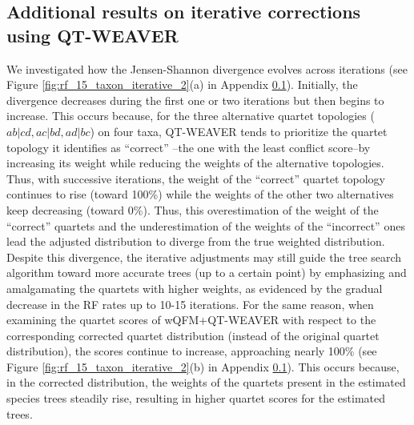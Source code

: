\documentclass[10pt,a4paper]{article}
\begin{document}
\begin{appendices}

\clearpage

\subsection{Additional results on iterative corrections using QT-WEAVER}
\label{app:iterations}

We investigated how the Jensen-Shannon divergence evolves across iterations (see Figure \ref{fig:rf_15_taxon_iterative_2}(a) in Appendix \ref{app:iterations}). Initially, the divergence decreases during the first one or two iterations but then begins to increase. This occurs because, for the three alternative quartet topologies ($ab|cd, ac|bd, ad|bc$) on four taxa, QT-WEAVER tends to prioritize the quartet topology it identifies as ``correct'' --the one with the least conflict score--by increasing its weight while reducing the weights of the alternative topologies.  Thus, with successive iterations, the weight of the ``correct'' quartet topology continues to rise (toward 100\%) while the weights of the other two alternatives keep decreasing (toward 0\%). Thus, this overestimation of the weight of the ``correct'' quartets and the underestimation of the weights of the ``incorrect'' ones lead the adjusted distribution to diverge from the true weighted distribution. Despite this divergence, the iterative adjustments may still guide the tree search algorithm toward more accurate trees (up to a certain point) by emphasizing and amalgamating the quartets with higher weights, as evidenced by the gradual decrease in the RF rates up to 10-15 iterations. For the same reason, when examining the quartet scores of wQFM+QT-WEAVER with respect to the corresponding corrected quartet distribution (instead of the original quartet distribution), the scores continue to increase, approaching nearly 100\% (see Figure \ref{fig:rf_15_taxon_iterative_2}(b) in Appendix \ref{app:iterations}). This occurs because, in the corrected distribution, the weights of the quartets present in the estimated species trees steadily rise, resulting in higher quartet scores for the estimated trees.



\end{appendices}
\end{document}
